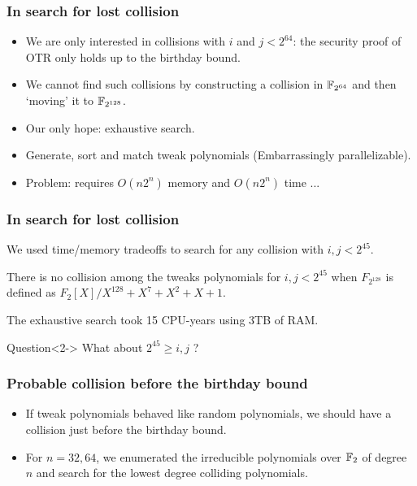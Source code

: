\documentclass{beamer}
\begin{document}
	\begin{frame}
		\frametitle{In search for lost collision}

		\begin{itemize}
			\item We are only interested in collisions with $i$ and $j < 2^{64}$: the security proof of OTR only holds up to the birthday bound.
			
			\item<2-> We cannot find such collisions by constructing a collision in $\mathbb{F}_{2^{64}}$ and then `moving' it to $\mathbb{F}_{2^{128}}$.
			
			\item<3-> Our only hope: exhaustive search. 
			
			\item<4-> Generate, sort and match tweak polynomials (Embarrassingly parallelizable).
			
			\item<5-> Problem: requires $O(n 2^n)$ memory and $O(n 2^n)$ time ...
		\end{itemize}
	\end{frame}

	\begin{frame}
		\frametitle{In search for lost collision}



We used time/memory tradeoffs to search for any collision with $i, j < 2^{45}$.

		\begin{theorem}
			There is no collision among the tweaks polynomials for $i, j < 2^{45}$ when $F_{2^{128}}$ is defined as $F_2[X]/X^{128}+X^{7}+X^{2}+X+1$.
		\end{theorem}
		
		The exhaustive search took 15 CPU-years using 3TB of RAM.


		\begin{exampleblock}{Question}<2->
			What about $2^{45} \geq i, j$ ?
		\end{exampleblock}
	\end{frame}

	\begin{frame}
		\frametitle{Probable collision before the birthday bound}

		\begin{itemize}
			\item If tweak polynomials behaved like random polynomials, we should have a collision just before the birthday bound.
			
			\item For $n = 32, 64$, we enumerated the irreducible polynomials over $\mathbb{F}_2$ of degree $n$ and search for the lowest degree colliding polynomials.
		\end{itemize}
		
	\end{frame}
\end{document}
